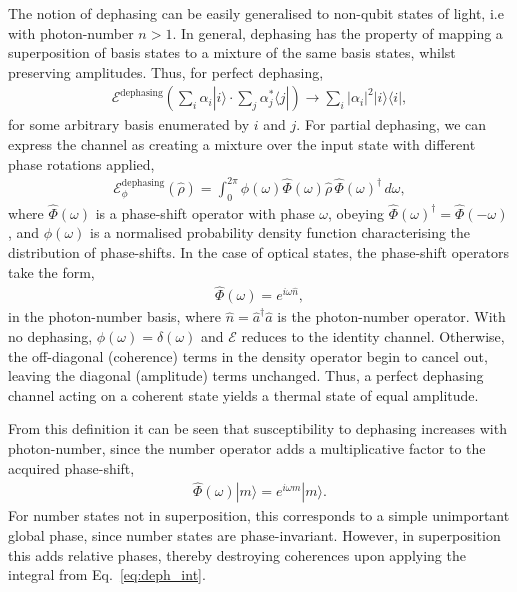\documentclass[aps,rmp,twocolumn,amsmath,amssymb,nofootinbib,superscriptaddress,longbibliography,floatfix]{revtex4-1}
\newcommand{\bra}[1]{\langle#1|}
\newcommand{\ket}[1]{|#1\rangle}
\begin{document}
The notion of dephasing can be easily generalised to non-qubit states of light, i.e with photon-number \mbox{$n>1$}. In general, dephasing has the property of mapping a superposition of basis states to a mixture of the same basis states, whilst preserving amplitudes. Thus, for perfect dephasing,
\begin{align}
\mathcal{E}^\mathrm{dephasing}\left(\sum_i \alpha_i\ket{i} \cdot \sum_j \alpha_j^*\bra{j} \right) \to \sum_i |\alpha_i|^2 \ket{i}\bra{i},
\end{align}
for some arbitrary basis enumerated by $i$ and $j$. For partial dephasing, we can express the channel as creating a mixture over the input state with different phase rotations applied,
\begin{align} \label{eq:deph_int}
\mathcal{E}_{\phi}^\mathrm{dephasing}(\hat\rho) = \int_{0}^{2\pi} \phi(\omega) \hat{\Phi}(\omega)\hat\rho\,\hat{\Phi}(\omega)^\dag\,d\omega,
\end{align}
where $\hat{\Phi}(\omega)$ is a phase-shift operator with phase $\omega$, obeying \mbox{$\hat\Phi(\omega)^\dag = \hat\Phi(-\omega)$}, and $\phi(\omega)$ is a normalised probability density function characterising the distribution of phase-shifts. In the case of optical states, the phase-shift operators take the form,
\begin{align}
\hat\Phi(\omega) = e^{i\omega\hat{n}},
\end{align}
in the photon-number basis, where $\hat{n}=\hat{a}^\dag\hat{a}$ is the photon-number operator. With no dephasing, \mbox{$\phi(\omega)=\delta(\omega)$} and $\mathcal{E}$ reduces to the identity channel. Otherwise, the off-diagonal (coherence) terms in the density operator begin to cancel out, leaving the diagonal (amplitude) terms unchanged. Thus, a perfect dephasing channel acting on a coherent state yields a thermal state of equal amplitude.

From this definition it can be seen that susceptibility to dephasing increases with photon-number, since the number operator adds a multiplicative factor to the acquired phase-shift,
\begin{align}
\hat\Phi(\omega) \ket{m} = e^{i\omega m}\ket{m}.
\end{align}
For number states not in superposition, this corresponds to a simple unimportant global phase, since number states are phase-invariant. However, in superposition this adds relative phases, thereby destroying coherences upon applying the integral from Eq.~\ref{eq:deph_int}.

%
%
\end{document}
